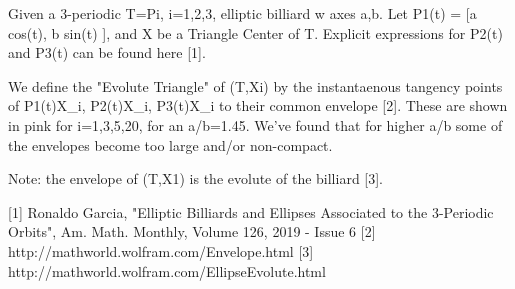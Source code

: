 Given a 3-periodic T=Pi, i=1,2,3, elliptic billiard w axes a,b. Let P1(t) = [a cos(t), b sin(t) ], and X be a Triangle Center of T. Explicit expressions for P2(t) and P3(t) can be found here [1].

We define the "Evolute Triangle" of (T,Xi) by the instantaenous tangency points of P1(t)X_i, P2(t)X_i, P3(t)X_i to their common envelope [2]. These are shown in pink for i=1,3,5,20, for an a/b=1.45. We've found that for higher a/b some of the envelopes become too large and/or non-compact.

Note: the envelope of (T,X1) is the evolute of the billiard [3].
 
[1] Ronaldo Garcia, "Elliptic Billiards and Ellipses Associated to the 3-Periodic Orbits", Am. Math. Monthly, Volume 126, 2019 - Issue 6
[2] http://mathworld.wolfram.com/Envelope.html
[3] http://mathworld.wolfram.com/EllipseEvolute.html